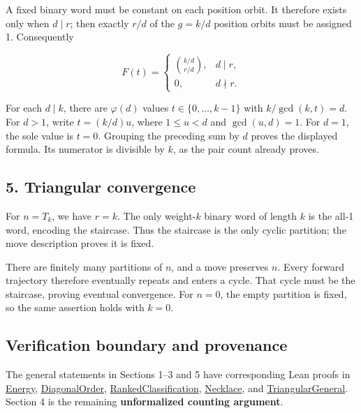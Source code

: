 \documentclass[11pt,a4paper]{article}
\begin{document}
A fixed binary word must be constant on each position orbit. It therefore exists only when \(d\mid r\); then exactly \(r/d\) of the \(g=k/d\) position orbits must be assigned 1. Consequently

\[
F(t)=\begin{cases}
\binom{k/d}{r/d},&d\mid r,\\
0,&d\nmid r.
\end{cases}
\]

For each \(d\mid k\), there are \(\varphi(d)\) values \(t\in\{0,\ldots,k-1\}\) with \(k/\gcd(k,t)=d\). For \(d>1\), write \(t=(k/d)u\), where \(1\le u<d\) and \(\gcd(u,d)=1\). For \(d=1\), the sole value is \(t=0\). Grouping the preceding sum by \(d\) proves the displayed formula. Its numerator is divisible by \(k\), as the pair count already proves.

\subsection{5. Triangular convergence}\label{triangular-convergence}

For \(n=T_k\), we have \(r=k\). The only weight-\(k\) binary word of length \(k\) is the all-1 word, encoding the staircase. Thus the staircase is the only cyclic partition; the move description proves it is fixed.

There are finitely many partitions of \(n\), and a move preserves \(n\). Every forward trajectory therefore eventually repeats and enters a cycle. That cycle must be the staircase, proving eventual convergence. For \(n=0\), the empty partition is fixed, so the same assertion holds with \(k=0\).

\subsection{Verification boundary and provenance}\label{verification-boundary-and-provenance}

The general statements in Sections 1--3 and 5 have corresponding Lean proofs in \href{https://github.com/mpelteshki/climbing-to-the-frontier/blob/212bba53b1818c08c40b8c4b48f636651eaf6410/cagent/p3/lean/ProofPursuit/P3/Energy.lean}{Energy}, \href{https://github.com/mpelteshki/climbing-to-the-frontier/blob/212bba53b1818c08c40b8c4b48f636651eaf6410/cagent/p3/lean/ProofPursuit/P3/DiagonalOrder.lean}{DiagonalOrder}, \href{https://github.com/mpelteshki/climbing-to-the-frontier/blob/212bba53b1818c08c40b8c4b48f636651eaf6410/cagent/p3/lean/ProofPursuit/P3/RankedClassification.lean}{RankedClassification}, \href{https://github.com/mpelteshki/climbing-to-the-frontier/blob/212bba53b1818c08c40b8c4b48f636651eaf6410/cagent/p3/lean/ProofPursuit/P3/Necklace.lean}{Necklace}, and \href{https://github.com/mpelteshki/climbing-to-the-frontier/blob/212bba53b1818c08c40b8c4b48f636651eaf6410/cagent/p3/lean/ProofPursuit/P3/TriangularGeneral.lean}{TriangularGeneral}. Section 4 is the remaining \textbf{unformalized counting argument}.
\end{document}
